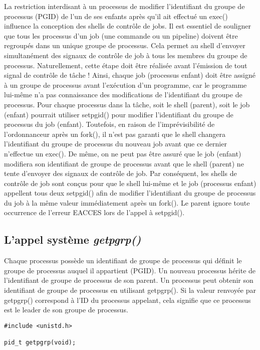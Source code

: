 La restriction interdisant à un processus de modifier l'identifiant du groupe de processus (PGID) de l'un de ses enfants après qu'il ait effectué un exec() influence la conception des shells de contrôle de jobs.
\newline
Il est essentiel de souligner que tous les processus d'un job (une commande ou un pipeline) doivent être regroupés dans un unique groupe de processus. Cela permet au shell d'envoyer simultanément des signaux de contrôle de job à tous les membres du groupe de processus. Naturellement, cette étape doit être réalisée avant l'émission de tout signal de contrôle de tâche !
\newline
Ainsi, chaque job (processus enfant) doit être assigné à un groupe de processus avant l'exécution d'un programme, car le programme lui-même n'a pas connaissance des modifications de l'identifiant du groupe de processus.
\newline
Pour chaque processus dans la tâche, soit le shell (parent), soit le job (enfant) pourrait utiliser setpgid() pour modifier l'identifiant du groupe de processus du job (enfant). Toutefois, en raison de l'imprévisibilité de l'ordonnanceur après un fork(), il n'est pas garanti que le shell changera l'identifiant du groupe de processus du nouveau job avant que ce dernier n'effectue un exec(). De même, on ne peut pas être assuré que le job (enfant) modifiera son identifiant de groupe de processus avant que le shell (parent) ne tente d'envoyer des signaux de contrôle de job. Par conséquent, les shells de contrôle de job sont conçus pour que le shell lui-même et le job (processus enfant) appellent tous deux setpgid() afin de modifier l'identifiant du groupe de processus du job à la même valeur immédiatement après un fork(). Le parent ignore toute occurrence de l'erreur EACCES lors de l'appel à setpgid().
\newline

\subsection{L’appel système \textit{getpgrp()} }
Chaque processus possède un identifiant de groupe de processus qui définit le groupe de processus auquel il appartient (PGID). Un nouveau processus hérite de l'identifiant de groupe de processus de son parent. Un processus peut obtenir son identifiant de groupe de processus en utilisant getpgrp(). Si la valeur renvoyée par getpgrp() correspond à l'ID du processus appelant, cela signifie que ce processus est le leader de son groupe de processus.
\newline
\begin{lstlisting}[frame=single]
#include <unistd.h>

pid_t getpgrp(void);
\end{lstlisting}
